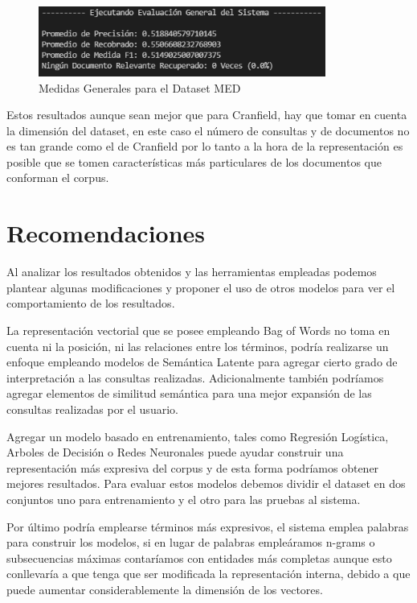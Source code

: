 \documentclass[runningheads,a4paper]{llncs}
\begin{document}
\begin{figure}
	\centering
	\includegraphics[height=2.3cm]{imgs/eval_general_med.png}
	\caption{Medidas Generales para el Dataset MED}
	\label{fig:med1gen}
\end{figure}

Estos resultados aunque sean mejor que para Cranfield, hay que tomar en cuenta la dimensión del dataset, en este caso el número de consultas y de documentos no es tan grande como el de Cranfield por lo tanto a la hora de la representación es posible que se tomen características más particulares de los documentos que conforman el corpus. 


\section{Recomendaciones}

Al analizar los resultados obtenidos y las herramientas empleadas podemos plantear algunas modificaciones y proponer el uso de otros modelos para ver el comportamiento de los resultados.

La representación vectorial que se posee empleando Bag of Words no toma en cuenta ni la posición, ni las relaciones entre los términos, podría realizarse un enfoque empleando modelos de Semántica Latente para agregar cierto grado de interpretación a las consultas realizadas. Adicionalmente también podríamos agregar elementos de 
similitud semántica para una mejor expansión de las consultas realizadas por el usuario.

Agregar un modelo basado en entrenamiento, tales como Regresión Logística, Arboles de Decisión o Redes Neuronales puede ayudar construir una representación más expresiva del corpus y de esta forma podríamos obtener mejores resultados. Para evaluar estos modelos debemos dividir el dataset en dos conjuntos uno para entrenamiento y el otro para las pruebas al sistema.

Por último podría emplearse términos más expresivos, el sistema emplea palabras para construir los modelos, si en lugar de palabras empleáramos n-grams o subsecuencias máximas contaríamos con entidades más completas aunque esto conllevaría a que tenga que ser modificada la representación interna, debido a que puede aumentar considerablemente la dimensión de los vectores.
\end{document}
